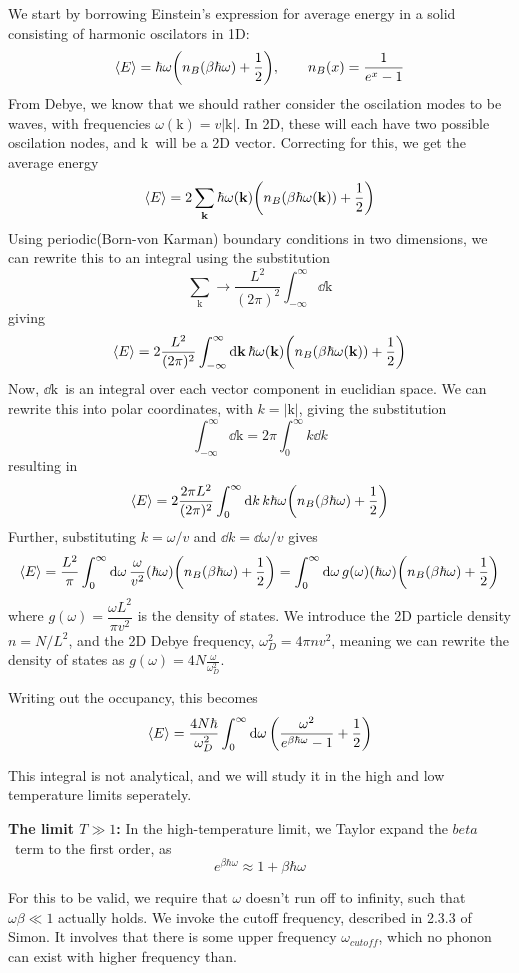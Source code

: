 \documentclass[12p,a4paper]{article}
\renewcommand{\exp}{e^}
\renewcommand{\b}[1]{\boldsymbol{\mathrm{#1}}}
\newcommand{\half}{\frac{1}{2}}
\renewcommand{\exp}{e^}
\begin{document}
We start by borrowing Einstein's expression for average energy in a solid consisting of harmonic oscilators in 1D:
\[
    \langle E \rangle = \hbar\omega\qty(n_B(\beta\hbar\omega) + \half), \quad\quad n_B(x) = \frac{1}{\exp{x} - 1}
\]
From Debye, we know that we should rather consider the oscilation modes to be waves, with frequencies $\omega(\b k) = v|\b k|$. In 2D, these will each have two possible oscilation nodes, and $\b k$ will be a 2D vector. Correcting for this, we get the average energy
\[
    \langle E \rangle = 2\sum_{\b k} \hbar \omega (\b k)\qty(n_B(\beta\hbar\omega (\b k)) + \half )
\]
Using periodic(Born-von Karman) boundary conditions in two dimensions, we can rewrite this to an integral using the substitution
\[
    \sum_{\b k} \rightarrow \frac{L^2}{(2\pi)^2} \int_{-\infty}^{\infty} \dd{\b k}
\]
giving
\[
    \langle E \rangle = 2 \frac{L^2}{(2\pi)^2} \int_{-\infty}^{\infty} \dd{\b k} \hbar \omega (\b k)\qty(n_B(\beta\hbar\omega (\b k)) + \half )
\]
Now, $\dd{\b k}$ is an integral over each vector component in euclidian space. We can rewrite this into polar coordinates, with $k = |\b k|$, giving the substitution
\[
    \int_{-\infty}^{\infty} \dd{\b k} = 2\pi\int_0^\infty k \dd{k}
\]
resulting in
\[
    \langle E \rangle = 2 \frac{2\pi L^2}{(2\pi)^2} \int_0^{\infty} \dd{k} k \hbar \omega \qty(n_B(\beta\hbar\omega) + \half )
\]
Further, substituting $k = \omega/v$ and $\dd{k} = \dd{\omega}/v$ gives
\[
    \langle E \rangle = \frac{L^2}{\pi} \int_0^{\infty} \dd{\omega} \frac{\omega}{v^2} (\hbar \omega) \qty(n_B(\beta\hbar\omega) + \half ) =
    \int_0^{\infty} \dd{\omega} g(\omega) (\hbar \omega) \qty(n_B(\beta\hbar\omega) + \half ) 
\]
where $g(\omega) = \dfrac{\omega L^2}{\pi v^2}$ is the density of states. We introduce the 2D particle density $n = N/L^2$, and the 2D Debye frequency, $\omega_D^2 = 4\pi n v^2$, meaning we can rewrite the density of states as $g(\omega) = 4N\frac{\omega}{\omega_D^2}$.

Writing out the occupancy, this becomes
\[
    \langle E \rangle = \frac{4N\hbar}{\omega_D^2} \int_0^{\infty} \dd{\omega} \qty(\frac{\omega^2}{\exp{\beta\hbar\omega} - 1} + \half )
\]

This integral is not analytical, and we will study it in the high and low temperature limits seperately.


\textbf{The limit $T \gg 1$:}
In the high-temperature limit, we Taylor expand the $beta$ term to the first order, as
\[
    \exp{\beta\hbar\omega} \approx 1 + \beta\hbar\omega
\]

For this to be valid, we require that $\omega$ doesn't run off to infinity, such that $\omega\beta \ll 1$ actually holds. We invoke the cutoff frequency, described in 2.3.3 of Simon. It involves that there is some upper frequency $\omega_{cutoff}$, which no phonon can exist with higher frequency than.
\end{document}
